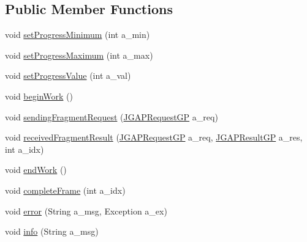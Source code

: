 \subsection*{Public Member Functions}
\begin{DoxyCompactItemize}
\item 
void \hyperlink{interfaceorg_1_1jgap_1_1distr_1_1grid_1_1gp_1_1_i_client_feedback_g_p_a393b39247fb4f2617195e09da8a89e08}{set\-Progress\-Minimum} (int a\-\_\-min)
\item 
void \hyperlink{interfaceorg_1_1jgap_1_1distr_1_1grid_1_1gp_1_1_i_client_feedback_g_p_a3172ea8765b9ec4c0f92d255d3f3b8c2}{set\-Progress\-Maximum} (int a\-\_\-max)
\item 
void \hyperlink{interfaceorg_1_1jgap_1_1distr_1_1grid_1_1gp_1_1_i_client_feedback_g_p_af75a58ac732c3ccb08dc1b58b6b276ae}{set\-Progress\-Value} (int a\-\_\-val)
\item 
void \hyperlink{interfaceorg_1_1jgap_1_1distr_1_1grid_1_1gp_1_1_i_client_feedback_g_p_a9f3635473f8f5d1b9b18c9bfba081930}{begin\-Work} ()
\item 
void \hyperlink{interfaceorg_1_1jgap_1_1distr_1_1grid_1_1gp_1_1_i_client_feedback_g_p_affa01427d8e3af6cb04fe8c82aceb58d}{sending\-Fragment\-Request} (\hyperlink{classorg_1_1jgap_1_1distr_1_1grid_1_1gp_1_1_j_g_a_p_request_g_p}{J\-G\-A\-P\-Request\-G\-P} a\-\_\-req)
\item 
void \hyperlink{interfaceorg_1_1jgap_1_1distr_1_1grid_1_1gp_1_1_i_client_feedback_g_p_a71fbfe8fd173cf975e4e99b29d5fc129}{received\-Fragment\-Result} (\hyperlink{classorg_1_1jgap_1_1distr_1_1grid_1_1gp_1_1_j_g_a_p_request_g_p}{J\-G\-A\-P\-Request\-G\-P} a\-\_\-req, \hyperlink{classorg_1_1jgap_1_1distr_1_1grid_1_1gp_1_1_j_g_a_p_result_g_p}{J\-G\-A\-P\-Result\-G\-P} a\-\_\-res, int a\-\_\-idx)
\item 
void \hyperlink{interfaceorg_1_1jgap_1_1distr_1_1grid_1_1gp_1_1_i_client_feedback_g_p_a25c75c0b03f9ac5dbefd751f0f99155e}{end\-Work} ()
\item 
void \hyperlink{interfaceorg_1_1jgap_1_1distr_1_1grid_1_1gp_1_1_i_client_feedback_g_p_a7e6b78cc1db4df6ba799ceee18ec924f}{complete\-Frame} (int a\-\_\-idx)
\item 
void \hyperlink{interfaceorg_1_1jgap_1_1distr_1_1grid_1_1gp_1_1_i_client_feedback_g_p_a34bf1b0f6e62c0443849b6db13f0ad0a}{error} (String a\-\_\-msg, Exception a\-\_\-ex)
\item 
void \hyperlink{interfaceorg_1_1jgap_1_1distr_1_1grid_1_1gp_1_1_i_client_feedback_g_p_a39c3bfccb867a7472f804bcca64bc8ca}{info} (String a\-\_\-msg)
\end{DoxyCompactItemize}
